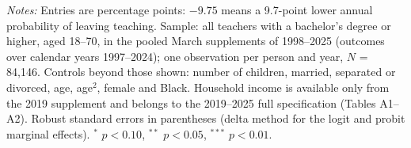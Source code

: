 \documentclass[11pt]{article}
\begin{document}
\begin{center}
\begin{threeparttable}
\begin{tablenotes}[flushleft]
\footnotesize
\item \emph{Notes:} Entries are percentage points: $-9.75$ means a
9.7-point lower annual probability of leaving teaching. Sample: all
teachers with a bachelor's degree or higher, aged
18--70, in the pooled March supplements of 1998--2025 (outcomes over
calendar years 1997--2024); one observation per person and year,
$N$ = 84,146. Controls beyond those shown: number of
children, married, separated or divorced, age, age$^2$, female and
Black. Household
income is available only from the 2019 supplement and belongs to the
2019--2025 full specification (Tables A1--A2). Robust standard errors in parentheses (delta
method for the logit and probit marginal effects). $^{*}$ $p<0.10$,
$^{**}$ $p<0.05$, $^{***}$ $p<0.01$.
\end{tablenotes}
\end{threeparttable}
\end{center}
\end{document}
